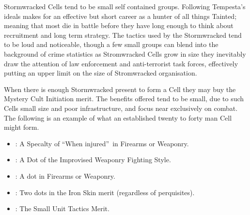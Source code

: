 Stormwracked Cells tend to be small self contained groups. Following Tempesta's ideals makes for an effective but short career as a hunter of all things Tainted; meaning that most die in battle before they have long enough to think about recruitment and long term strategy. The tactics used by the Stormwracked tend to be loud and noticeable, though a few small groups can blend into the background of crime statistics as Stromwracked Cells grow in size they inevitably draw the attention of law enforcement and anti-terrorist task forces, effectively putting an upper limit on the size of Stromwracked organisation. 

When there is enough Stormwracked present to form a Cell they may buy the Mystery Cult Initiation merit. The benefits offered tend to be small, due to such Cells small size and poor infrastructure, and focus near exclusively on combat. The following is an example of what an established twenty to forty man Cell might form.  

\begin{itemize}
 \item \textbullet: A Specalty of \textquotedblleft When injured\textquotedblright\, in Firearms or Weaponry.
 \item \textbullet\textbullet: A Dot of the Improvised Weaponry Fighting Style. 
 \item \textbullet\textbullet\textbullet: A dot in Firearms or Weaponry.
 \item \textbullet\textbullet\textbullet\textbullet: Two dots in the Iron Skin merit (regardless of perquisites).
 \item \textbullet\textbullet\textbullet\textbullet\textbullet: The Small Unit Tactics Merit.
\end{itemize}



